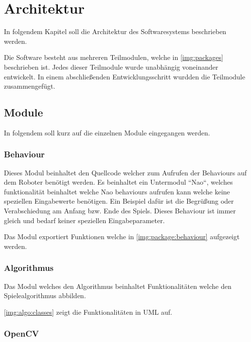 \chapter{Architektur}

    In folgendem Kapitel soll die Architektur des Softwaresystems beschrieben
    werden.

    Die Software besteht aus mehreren Teilmodulen, welche in
    \autoref{img:packages} beschrieben ist.
    Jedes dieser Teilmodule wurde unabhängig voneinander entwickelt. In einem
    abschließenden Entwicklungsschritt wurdden die Teilmodule zusammengefügt.

    \section{Module}

        In folgendem soll kurz auf die einzelnen Module eingegangen werden.

        \subsection{Behaviour}

            Dieses Modul beinhaltet den Quellcode welcher zum Aufrufen der
            Behaviours auf dem Roboter benötigt werden.
            Es beinhaltet ein Untermodul ``Nao``, welches funktionalität
            beinhaltet welche Nao behaviours aufrufen kann welche keine
            speziellen Eingabewerte benötigen.
            Ein Beispiel dafür ist die Begrüßung oder Verabschiedung am Anfang
            bzw. Ende des Spiels.
            Dieses Behaviour ist immer gleich und bedarf keiner speziellen
            Eingabeparameter.

            Das Modul exportiert Funktionen welche in
            \autoref{img:package:behaviour} aufgezeigt werden.

        \subsection{Algorithmus}

            Das Modul welches den Algorithmus beinhaltet Funktionalitäten welche
            den Spielealgorithmus abbilden.

            \autoref{img:algo:classes} zeigt die Funktionalitäten in UML auf.

        \subsection{OpenCV}

